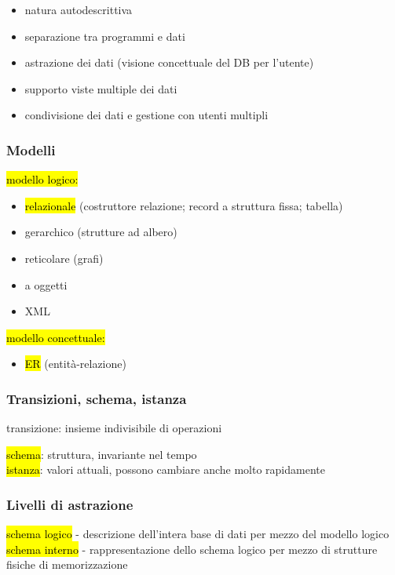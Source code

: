 \documentclass[a4paper]{article}
\begin{document}
\begin{itemize}[noitemsep]
  \item natura autodescrittiva
  \item separazione tra programmi e dati
  \item astrazione dei dati (visione concettuale del DB per l'utente)
  \item supporto viste multiple dei dati
  \item condivisione dei dati e gestione con utenti multipli
\end{itemize}\par \subsubsection{Modelli}
\hl{modello logico:}
\begin{itemize}[noitemsep]
  \item \hl{relazionale} (costruttore relazione; record a struttura fissa; tabella)
  \item gerarchico (strutture ad albero)
  \item reticolare (grafi)
  \item a oggetti
  \item XML
\end{itemize}
\hl{modello concettuale:}
\begin{itemize}[noitemsep]
  \item \hl{ER} (entità-relazione)
\end{itemize}\par \subsubsection{Transizioni, schema, istanza}
transizione: insieme indivisibile di operazioni\medskip\\\par \hl{schema}: struttura, invariante nel tempo\\
\hl{istanza}: valori attuali, possono cambiare anche molto rapidamente\par \subsubsection{Livelli di astrazione}
\hl{schema logico} - descrizione dell’intera base di dati per mezzo del modello logico\\
\hl{schema interno} - rappresentazione dello schema logico per mezzo di strutture fisiche di memorizzazione\\
\end{document}
